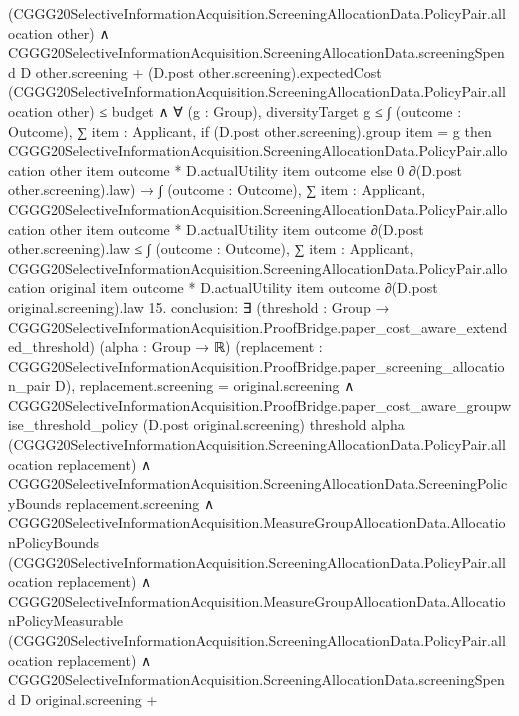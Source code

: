 \documentclass[10pt]{article}
\begin{document}
\begin{ReviewVerbatim}
              (CGGG20SelectiveInformationAcquisition.ScreeningAllocationData.PolicyPair.allocation other) ∧
            CGGG20SelectiveInformationAcquisition.ScreeningAllocationData.screeningSpend D other.screening +
                  (D.post other.screening).expectedCost
                    (CGGG20SelectiveInformationAcquisition.ScreeningAllocationData.PolicyPair.allocation other) ≤
                budget ∧
              ∀ (g : Group),
                diversityTarget g ≤
                  ∫ (outcome : Outcome),
                    ∑ item : Applicant,
                      if (D.post other.screening).group item = g then
                        CGGG20SelectiveInformationAcquisition.ScreeningAllocationData.PolicyPair.allocation other item
                            outcome *
                          D.actualUtility item outcome
                      else 0 ∂(D.post other.screening).law) →
      ∫ (outcome : Outcome),
          ∑ item : Applicant,
            CGGG20SelectiveInformationAcquisition.ScreeningAllocationData.PolicyPair.allocation other item outcome *
              D.actualUtility item outcome ∂(D.post other.screening).law ≤
        ∫ (outcome : Outcome),
          ∑ item : Applicant,
            CGGG20SelectiveInformationAcquisition.ScreeningAllocationData.PolicyPair.allocation original item outcome *
              D.actualUtility item outcome ∂(D.post original.screening).law
15. conclusion: ∃ (threshold : Group → CGGG20SelectiveInformationAcquisition.ProofBridge.paper_cost_aware_extended_threshold) (alpha :
  Group → ℝ) (replacement : CGGG20SelectiveInformationAcquisition.ProofBridge.paper_screening_allocation_pair D),
  replacement.screening = original.screening ∧
    CGGG20SelectiveInformationAcquisition.ProofBridge.paper_cost_aware_groupwise_threshold_policy
        (D.post original.screening) threshold alpha
        (CGGG20SelectiveInformationAcquisition.ScreeningAllocationData.PolicyPair.allocation replacement) ∧
      CGGG20SelectiveInformationAcquisition.ScreeningAllocationData.ScreeningPolicyBounds replacement.screening ∧
        CGGG20SelectiveInformationAcquisition.MeasureGroupAllocationData.AllocationPolicyBounds
            (CGGG20SelectiveInformationAcquisition.ScreeningAllocationData.PolicyPair.allocation replacement) ∧
          CGGG20SelectiveInformationAcquisition.MeasureGroupAllocationData.AllocationPolicyMeasurable
              (CGGG20SelectiveInformationAcquisition.ScreeningAllocationData.PolicyPair.allocation replacement) ∧
            CGGG20SelectiveInformationAcquisition.ScreeningAllocationData.screeningSpend D original.screening +

\end{ReviewVerbatim}
\end{document}
